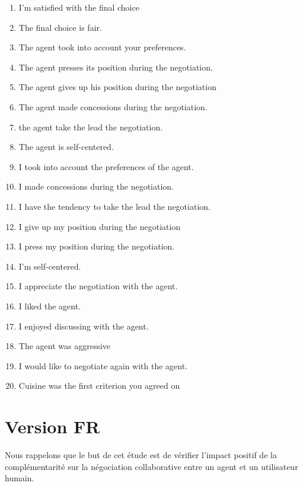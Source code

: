\documentclass [french]{paper}
\begin{document}
			\begin{enumerate}
				\item I'm satisfied with the final choice
				\item The final choice is fair.
				
				\item The agent took into account your preferences.
				\item The agent presses its position during the negotiation.
				\item The agent gives up his position during the negotiation
				\item The agent made concessions during the negotiation.
				\item the agent take the lead the negotiation.
				\item The agent is self-centered.
				
				\item I took into account the preferences of the agent.
				\item I made concessions during the negotiation.
				\item I have the tendency to take the lead the negotiation.
				\item I give up my position during the negotiation
				\item I press my position during the negotiation.
				\item I'm self-centered.
				
				\item I appreciate the negotiation with the agent.
				\item I liked the agent.
				\item I enjoyed discussing with the agent.
				\item The agent was aggressive
				\item I would like to negotiate again with the agent.
				
				\item Cuisine was the first criterion you agreed on 
				
			\end{enumerate}
			
	
	\section{Version FR}
		Nous rappelons que le but de cet étude est de vérifier l'impact positif de la complémentarité sur la négociation collaborative entre un agent et un utilisateur humain. 
		
\end{document}
